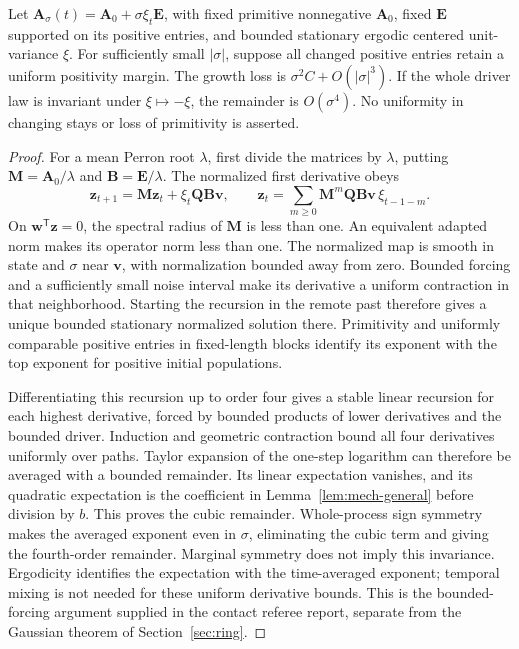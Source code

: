 \begin{lemma}\label{lem:mech-bounded}
Let \(\mathbf A_\sigma(t)=\mathbf A_0+\sigma\xi_t\mathbf E\), with fixed primitive nonnegative \(\mathbf A_0\), fixed \(\mathbf E\) supported on its positive entries, and bounded stationary ergodic centered unit-variance \(\xi\). For sufficiently small \(|\sigma|\), suppose all changed positive entries retain a uniform positivity margin. The growth loss is \(\sigma^2C+O(|\sigma|^3)\). If the whole driver law is invariant under \(\xi\mapsto-\xi\), the remainder is \(O(\sigma^4)\). No uniformity in changing stays or loss of primitivity is asserted.
\end{lemma}
\begin{proof}
For a mean Perron root \(\lambda\), first divide the matrices by \(\lambda\), putting \(\mathbf M=\mathbf A_0/\lambda\) and \(\mathbf B=\mathbf E/\lambda\). The normalized first derivative obeys
\[
 \mathbf z_{t+1}=\mathbf M\mathbf z_t+\xi_t\mathbf Q\mathbf B\mathbf v,
 \qquad \mathbf z_t=\sum_{m\geq0}\mathbf M^m\mathbf Q\mathbf B\mathbf v\,\xi_{t-1-m}.
\]
On \(\mathbf w^{\mathsf T}\mathbf z=0\), the spectral radius of \(\mathbf M\) is less than one. An equivalent adapted norm makes its operator norm less than one. The normalized map is smooth in state and \(\sigma\) near \(\mathbf v\), with normalization bounded away from zero. Bounded forcing and a sufficiently small noise interval make its derivative a uniform contraction in that neighborhood. Starting the recursion in the remote past therefore gives a unique bounded stationary normalized solution there. Primitivity and uniformly comparable positive entries in fixed-length blocks identify its exponent with the top exponent for positive initial populations.

Differentiating this recursion up to order four gives a stable linear recursion for each highest derivative, forced by bounded products of lower derivatives and the bounded driver. Induction and geometric contraction bound all four derivatives uniformly over paths. Taylor expansion of the one-step logarithm can therefore be averaged with a bounded remainder. Its linear expectation vanishes, and its quadratic expectation is the coefficient in Lemma~\ref{lem:mech-general} before division by \(b\). This proves the cubic remainder. Whole-process sign symmetry makes the averaged exponent even in \(\sigma\), eliminating the cubic term and giving the fourth-order remainder. Marginal symmetry does not imply this invariance. Ergodicity identifies the expectation with the time-averaged exponent; temporal mixing is not needed for these uniform derivative bounds. This is the bounded-forcing argument supplied in the contact referee report, separate from the Gaussian theorem of Section~\ref{sec:ring}.


\end{proof}
